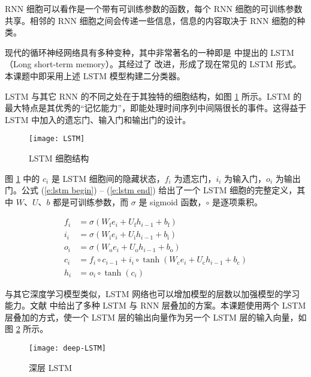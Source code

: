 RNN 细胞可以看作是一个带有可训练参数的函数，每个 RNN 细胞的可训练参数共享。相邻的 RNN 细胞之间会传递一些信息，信息的内容取决于 RNN 细胞的种类。

\label{s:classifer lstm}
现代的循环神经网络具有多种变种，其中非常著名的一种即是 \cite{Hochreiter1997} 中提出的 LSTM （Long short-term memory）。其经过了 \cite{Gers2000} 改进，形成了现在常见的 LSTM 形式。本课题中即采用上述 LSTM 模型构建二分类器。

LSTM 与其它 RNN 的不同之处在于其独特的细胞结构，如图 \ref{f:lstm} 所示。LSTM 的最大特点是其优秀的“记忆能力”，即能处理时间序列中间隔很长的事件。这得益于 LSTM 中加入的遗忘门、输入门和输出门的设计。

\begin{figure}[h]
	\centering
	\texttt{[image: LSTM]}
	\caption{LSTM 细胞结构}
	\label{f:lstm}
	\vspace{-1em}
\end{figure}

图 \ref{f:lstm} 中的 $c_i$ 是 LSTM 细胞间的隐藏状态，$f_i$ 为遗忘门，$i_i$ 为输入门，$o_i$ 为输出门。公式 (\ref{e:lstm begin}) -- (\ref{e:lstm end}) 给出了一个 LSTM 细胞的完整定义，其中 $W$、$U$、$b$ 都是可训练参数，而 $\sigma$ 是 sigmoid 函数，$\circ$ 是逐项乘积。

\begin{align}
f_i &= \sigma(W_\text{f} e_i + U_\text{f} h_{i - 1} + b_\text{f}) \label{e:lstm begin} \\
i_i &= \sigma(W_\text{i} e_i + U_\text{i} h_{i - 1} + b_\text{i}) \\
o_i &= \sigma(W_\text{o} e_i + U_\text{o} h_{i - 1} + b_\text{o}) \\
c_i &= f_i \circ c_{i - 1} + i_i \circ \tanh(W_\text{c} e_i + U_\text{c} h_{i - 1} + b_\text{c}) \\
h_i &= o_i \circ \tanh(c_i) \label{e:lstm end}
\end{align}

与其它深度学习模型类似，LSTM 网络也可以增加模型的层数以加强模型的学习能力。文献 \cite{Sak2014} 中给出了多种 LSTM 与 RNN 层叠加的方案。本课题使用两个 LSTM 层叠加的方式，使一个 LSTM 层的输出向量作为另一个 LSTM 层的输入向量，如图 \ref{f:deep lstm} 所示。

\begin{figure}[h]
	\centering
	\texttt{[image: deep-LSTM]}
	\caption{深层 LSTM}
	\label{f:deep lstm}
	\vspace{-1em}
\end{figure}

